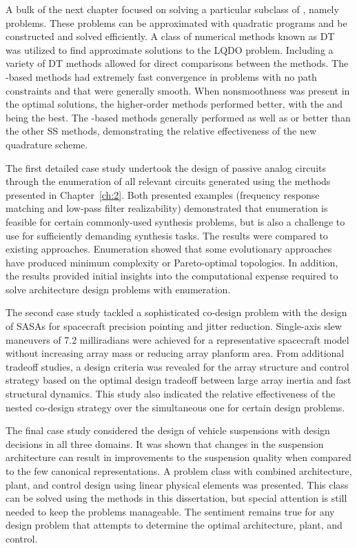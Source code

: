 A bulk of the next chapter focused on solving a particular subclass of , namely  problems.
These problems can be approximated with quadratic programs and be constructed and solved efficiently. 
A class of numerical methods known as DT was utilized to find approximate solutions to the LQDO problem.
Including a variety of DT methods allowed for direct comparisons between the methods.
The -based methods had extremely fast convergence in problems with no path constraints and that were generally smooth.
When nonsmoothness was present in the optimal solutions, the higher-order  methods performed better, with the  and  being the best.
The -based methods generally performed as well as or better than the other SS methods, demonstrating the relative effectiveness of the new quadrature scheme.

The first detailed case study undertook the design of passive analog
circuits through the enumeration of all relevant circuits generated using the methods presented in Chapter~\ref{ch:2}.
Both presented examples (frequency response matching and low-pass filter realizability) demonstrated that enumeration is feasible for certain commonly-used synthesis problems, but is also a challenge to use for sufficiently demanding synthesis tasks. 
The results were compared to existing approaches. 
Enumeration showed that some evolutionary approaches have produced minimum complexity or Pareto-optimal topologies.
In addition, the results provided initial insights into the computational expense required to solve architecture design problems with enumeration.

The second case study tackled a sophisticated co-design problem with the design of SASAs for spacecraft precision pointing and jitter reduction.
Single-axis slew maneuvers of 7.2 milliradians were achieved for a representative spacecraft model without increasing array mass or reducing array planform area.
From additional tradeoff studies, a design criteria was revealed for the array structure and control strategy based on the optimal design tradeoff between large array inertia and fast structural dynamics.
This study also indicated the relative effectiveness of the nested co-design strategy over the simultaneous one for certain design problems.

The final case study considered the design of vehicle suspensions with design decisions in all three domains.
It was shown that changes in the suspension architecture can result in improvements to the suspension quality when compared to the few canonical representations.
A problem class with combined architecture, plant, and control design using linear physical elements was presented. This class can be solved using the methods in this dissertation, but special attention is still needed to keep the problems manageable.
The sentiment remains true for any design problem that attempts to determine the optimal architecture, plant, and control.

